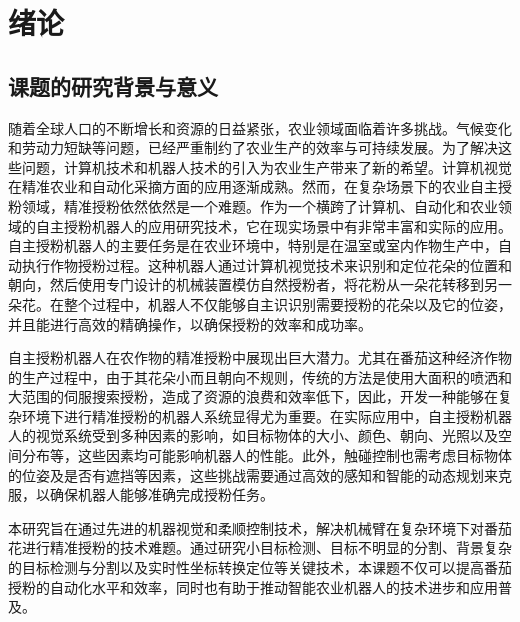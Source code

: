     
\chapter{绪论}\label{ch:1}


\section{课题的研究背景与意义}
随着全球人口的不断增长和资源的日益紧张，农业领域面临着许多挑战。气候变化和劳动力短缺等问题，已经严重制约了农业生产的效率与可持续发展。为了解决这些问题，计算机技术和机器人技术的引入为农业生产带来了新的希望。计算机视觉在精准农业和自动化采摘方面的应用逐渐成熟。然而，在复杂场景下的农业自主授粉领域，精准授粉依然依然是一个难题。作为一个横跨了计算机、自动化和农业领域的自主授粉机器人的应用研究技术，它在现实场景中有非常丰富和实际的应用。自主授粉机器人的主要任务是在农业环境中，特别是在温室或室内作物生产中，自动执行作物授粉过程。这种机器人通过计算机视觉技术来识别和定位花朵的位置和朝向，然后使用专门设计的机械装置模仿自然授粉者，将花粉从一朵花转移到另一朵花。在整个过程中，机器人不仅能够自主识识别需要授粉的花朵以及它的位姿，并且能进行高效的精确操作，以确保授粉的效率和成功率。

自主授粉机器人在农作物的精准授粉中展现出巨大潜力。尤其在番茄这种经济作物的生产过程中，由于其花朵小而且朝向不规则，传统的方法是使用大面积的喷洒和大范围的伺服搜索授粉，造成了资源的浪费和效率低下，因此，开发一种能够在复杂环境下进行精准授粉的机器人系统显得尤为重要。在实际应用中，自主授粉机器人的视觉系统受到多种因素的影响，如目标物体的大小、颜色、朝向、光照以及空间分布等，这些因素均可能影响机器人的性能。此外，触碰控制也需考虑目标物体的位姿及是否有遮挡等因素，这些挑战需要通过高效的感知和智能的动态规划来克服，以确保机器人能够准确完成授粉任务。

本研究旨在通过先进的机器视觉和柔顺控制技术，解决机械臂在复杂环境下对番茄花进行精准授粉的技术难题。通过研究小目标检测、目标不明显的分割、背景复杂的目标检测与分割以及实时性坐标转换定位等关键技术，本课题不仅可以提高番茄授粉的自动化水平和效率，同时也有助于推动智能农业机器人的技术进步和应用普及。




